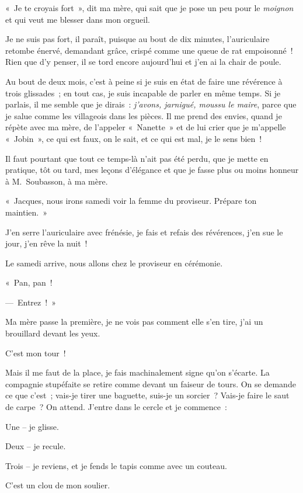 \documentclass[french,twoside]{book} %
\begin{document}
« Je te croyais fort », dit ma mère, qui sait que je pose un peu pour le \emph{moignon} et qui veut me blesser dans mon orgueil.\par
Je ne suis pas fort, il paraît, puisque au bout de dix minutes, l’auriculaire retombe énervé, demandant grâce, crispé comme une queue de rat empoisonné ! Rien que d’y penser, il se tord encore aujourd’hui et j’en ai la chair de poule.\par
Au bout de deux mois, c’est à peine si je suis en état de faire une révérence à trois glissades ; en tout cas, je suis incapable de parler en même temps. Si je parlais, il me semble que je dirais : \emph{j’avons, jarnigué, moussu le maire}, parce que je salue comme les villageois dans les pièces. Il me prend des envies, quand je répète avec ma mère, de l’appeler « Nanette » et de lui crier que je m’appelle « Jobin », ce qui est faux, on le sait, et ce qui est mal, je le sens bien !\par
\bigbreak
\noindent Il faut pourtant que tout ce temps-là n’ait pas été perdu, que je mette en pratique, tôt ou tard, mes leçons d’élégance et que je fasse plus ou moins honneur à M. Soubasson, à ma mère.\par
« Jacques, nous irons samedi voir la femme du proviseur. Prépare ton maintien. »\par
J’en serre l’auriculaire avec frénésie, je fais et refais des révérences, j’en sue le jour, j’en rêve la nuit !\par
Le samedi arrive, nous allons chez le proviseur en cérémonie.\par
« Pan, pan !\par
— Entrez ! »\par
Ma mère passe la première, je ne vois pas comment elle s’en tire, j’ai un brouillard devant les yeux.\par
\bigbreak
\noindent C’est mon tour !\par
Mais il me faut de la place, je fais machinalement signe qu’on s’écarte. La compagnie stupéfaite se retire comme devant un faiseur de tours. On se demande ce que c’est ; vais-je tirer une baguette, suis-je un sorcier ? Vais-je faire le saut de carpe ? On attend. J’entre dans le cercle et je commence :\par
Une – je glisse.\par
Deux – je recule.\par
Trois – je reviens, et je fends le tapis comme avec un couteau.\par
C’est un clou de mon soulier.\par
\end{document}
